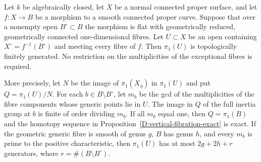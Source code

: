 \begin{proposition}
\label{D:vertical-fibration-multiplicity}
Let $k$ be algebraically closed, let $X$ be a normal connected
proper surface, and let $f:X\to B$ be a morphism to a smooth
connected proper curve.  Suppose that over a nonempty open
$B^\circ\subset B$ the morphism is flat with geometrically
reduced, geometrically connected one-dimensional fibres.
Let $U\subset X$ be an open containing $X^\circ=f^{-1}(B^\circ)$
and meeting every fibre of $f$.  Then $\pi_1(U)$ is topologically
finitely generated.  No restriction on the multiplicities of
the exceptional fibres is required.

More precisely, let $N$ be the image of
$\pi_1(X_{\overline\eta})$ in $\pi_1(U)$ and put
$Q=\pi_1(U)/N$.  For each $b\in B\setminus B^\circ$, let $m_b$
be the gcd of the multiplicities of the fibre components whose
generic points lie in $U$.  The image in $Q$ of the full inertia
group at $b$ is finite of order dividing $m_b$.
If all $m_b$ equal one, then $Q=\pi_1(B)$ and the homotopy
sequence in Proposition~\ref{D:vertical-fibration-exact} is exact.
If the geometric generic fibre is smooth of genus $g$, $B$ has
genus $h$, and every $m_b$ is prime to the positive
characteristic, then $\pi_1(U)$ has at most $2g+2h+r$ generators,
where $r=\#(B\setminus B^\circ)$.
\end{proposition}
